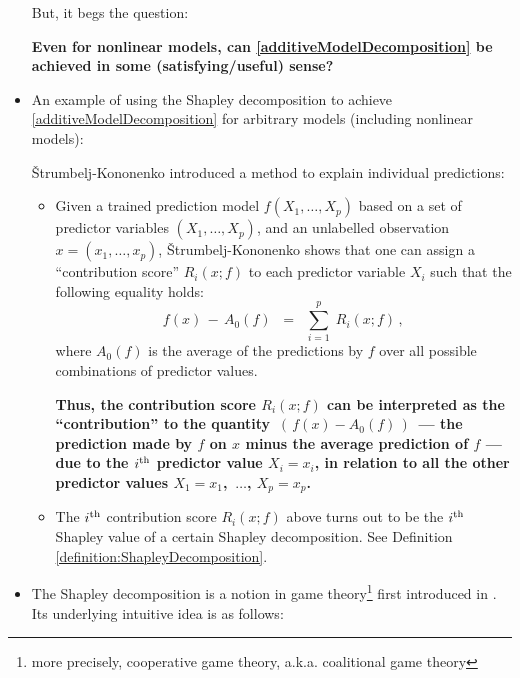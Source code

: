 \begin{itemize}
	But, it begs the question:
	\begin{center}
	\vskip -0.3cm
	\textbf{\color{red}Even for nonlinear models, can \eqref{additiveModelDecomposition}
	be achieved in some (satisfying/useful) sense?}
	\end{center}

\item
	An example of using the Shapley decomposition to achieve \eqref{additiveModelDecomposition}
	for arbitrary models (including nonlinear models):
	
	\v{S}trumbelj-Kononenko \cite{Strumbelj2010}
	introduced a method to {\color{red}explain individual predictions}:
	\begin{itemize}
	\item
		Given a trained prediction model $f(X_{1},\ldots,X_{p})$
		based on a set of predictor variables $(X_{1},\ldots,X_{p})$, and
		an unlabelled observation $x = (x_{1},\ldots,x_{p})$,
		\v{S}trumbelj-Kononenko \cite{Strumbelj2010} shows that
		one can assign a ``contribution score'' $R_{i}(x;f)$
		to each predictor variable $X_{i}$
		such that the following equality holds:
		\begin{equation*}
		f(x) \, - \, A_{0}(f)
		\;\; = \;\;
			\overset{p}{\underset{i=1}{\sum}}\;
			R_{i}(x;f)\,,
		\end{equation*}
		where $A_{0}(f)$ is the average of the predictions by $f$
		over all possible combinations of predictor values.

		\vskip 0.2cm
		\textbf{Thus, the contribution score $R_{i}(x;f)$ can be interpreted
		as the ``{\color{red}contribution}'' to the quantity \,$\left(\,f(x) - A_{0}(f)\,\right)$\,
		 --- the prediction made by $f$ on $x$ minus the average prediction of $f$ ---
		due to the $i^{\textnormal{th}}$ predictor value $X_{i} = x_{i}$,
		in relation to all the other predictor values
		$X_{1} = x_{1}$, \,$\ldots$\;, $X_{p} = x_{p}$.}
		\vskip 0.2cm
		
	\item
		The $i^{\textnormal{th}}$ contribution score $R_{i}(x;f)$ above
		turns out to be the $i^{\textnormal{th}}$ {\color{red}Shapley value} of
		a certain {\color{red}Shapley decomposition}.
		See Definition \eqref{definition:ShapleyDecomposition}.
	\end{itemize}

\item
	The Shapley decomposition is a notion
	in game theory\footnote{more precisely, cooperative game theory, a.k.a. coalitional game theory}
	first introduced in \cite{Shapley1953}.
	Its underlying intuitive idea is as follows:


\end{itemize}
